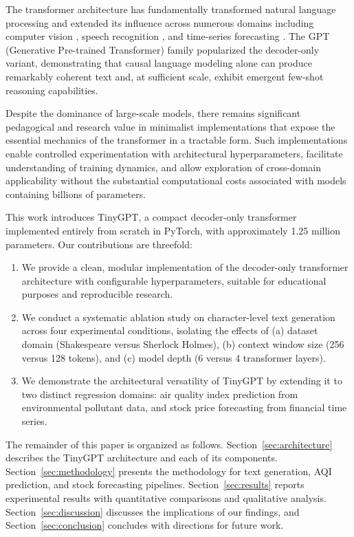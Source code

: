 \documentclass[conference]{IEEEtran}
\begin{document}
The transformer architecture \cite{vaswani2017attention} has fundamentally transformed natural language processing and extended its influence across numerous domains including computer vision \cite{dosovitskiyi2020image}, speech recognition \cite{gulati2020conformer}, and time-series forecasting \cite{wu2020autoformer}. The GPT (Generative Pre-trained Transformer) family \cite{radford2018improving, brown2020language} popularized the decoder-only variant, demonstrating that causal language modeling alone can produce remarkably coherent text and, at sufficient scale, exhibit emergent few-shot reasoning capabilities.

Despite the dominance of large-scale models, there remains significant pedagogical and research value in minimalist implementations that expose the essential mechanics of the transformer in a tractable form. Such implementations enable controlled experimentation with architectural hyperparameters, facilitate understanding of training dynamics, and allow exploration of cross-domain applicability without the substantial computational costs associated with models containing billions of parameters.

This work introduces TinyGPT, a compact decoder-only transformer implemented entirely from scratch in PyTorch, with approximately 1.25 million parameters. Our contributions are threefold:

\begin{enumerate}
    \item We provide a clean, modular implementation of the decoder-only transformer architecture with configurable hyperparameters, suitable for educational purposes and reproducible research.
    \item We conduct a systematic ablation study on character-level text generation across four experimental conditions, isolating the effects of (a) dataset domain (Shakespeare versus Sherlock Holmes), (b) context window size (256 versus 128 tokens), and (c) model depth (6 versus 4 transformer layers).
    \item We demonstrate the architectural versatility of TinyGPT by extending it to two distinct regression domains: air quality index prediction from environmental pollutant data, and stock price forecasting from financial time series.
\end{enumerate}

The remainder of this paper is organized as follows. Section~\ref{sec:architecture} describes the TinyGPT architecture and each of its components. Section~\ref{sec:methodology} presents the methodology for text generation, AQI prediction, and stock forecasting pipelines. Section~\ref{sec:results} reports experimental results with quantitative comparisons and qualitative analysis. Section~\ref{sec:discussion} discusses the implications of our findings, and Section~\ref{sec:conclusion} concludes with directions for future work.
\end{document}
